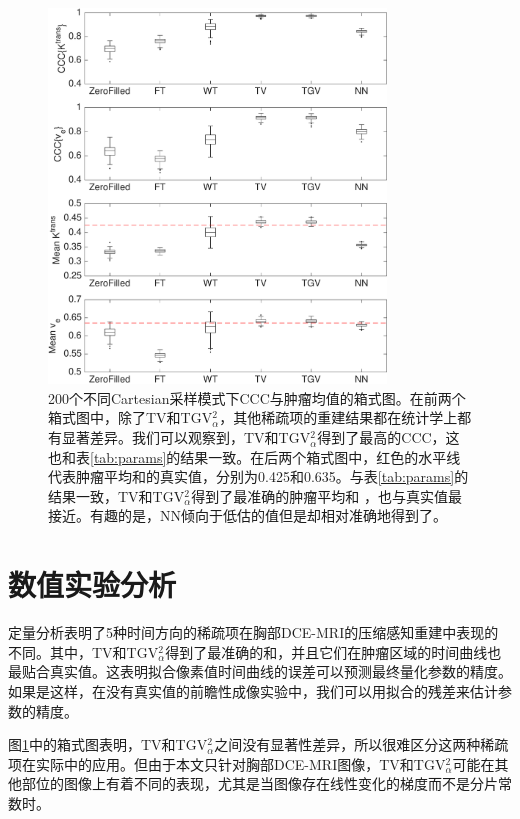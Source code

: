 \begin{figure}[htbp]
\centerline{
    \includegraphics[width=0.8\textwidth]{img/qetsr/figure7.eps}
}
\caption{
200个不同Cartesian采样模式下CCC与肿瘤均值的箱式图。在前两个箱式图中，除了TV和TGV$_{\alpha}^2$，其他稀疏项的重建结果都在统计学上都有显著差异。我们可以观察到，TV和TGV$_{\alpha}^2$得到了最高的CCC，这也和表\ref{tab:params}的结果一致。在后两个箱式图中，红色的水平线代表肿瘤平均\kt 和\Ve 的真实值，分别为0.425和0.635。与表\ref{tab:params}的结果一致，TV和TGV$_{\alpha}^2$得到了最准确的肿瘤平均\kt 和 \Ve，也与真实值最接近。有趣的是，NN倾向于低估\kt 的值但是却相对准确地得到了\Ve。
}
\label{fig:paramsbp}
\end{figure}

\section{数值实验分析}
定量分析表明了5种时间方向的稀疏项在胸部DCE-MRI的压缩感知重建中表现的不同。其中，TV和TGV$_{\alpha}^2$得到了最准确的\kt 和\Ve ，并且它们在肿瘤区域的时间曲线也最贴合真实值。这表明拟合像素值时间曲线的误差可以预测最终量化参数的精度。如果是这样，在没有真实值的前瞻性成像实验中，我们可以用拟合的残差来估计参数的精度。

图\ref{fig:paramsbp}中的箱式图表明，TV和TGV$_{\alpha}^2$之间没有显著性差异，所以很难区分这两种稀疏项在实际中的应用。但由于本文只针对胸部DCE-MRI图像，TV和TGV$_{\alpha}^2$可能在其他部位的图像上有着不同的表现，尤其是当图像存在线性变化的梯度而不是分片常数时。

